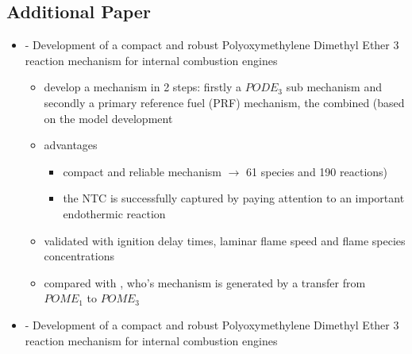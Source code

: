 \documentclass[12pt,oneside,a4paper,english]{article}
\begin{document}
\subsection{Additional Paper} %
\begin{itemize}
\item{\cite{Lin2019} - Development of a compact and robust Polyoxymethylene Dimethyl Ether 3 reaction mechanism for internal combustion engines}

	\begin{itemize}
	\item{develop a mechanism in 2 steps: firstly a $PODE_3$ sub mechanism and secondly a primary reference fuel (PRF) mechanism, the combined (based on the \cite{Ren2019} model development}
	\item{advantages}
	
		\begin{itemize}
		\item{compact and reliable mechanism $\rightarrow$ 61 species and 190 reactions)}
		\item{the NTC is successfully captured by paying attention to an important endothermic reaction}
		\end{itemize}
	
	\item{validated with ignition delay times, laminar flame speed and flame species concentrations}
	\item{compared with \cite{He2018}, who's mechanism is generated by a transfer from $POME_1$ to $POME_3$}	
	\end{itemize}

\item{\cite{Lv2019} - Development of a compact and robust Polyoxymethylene Dimethyl Ether 3 reaction mechanism for internal combustion engines}


\end{itemize}
\end{document}
